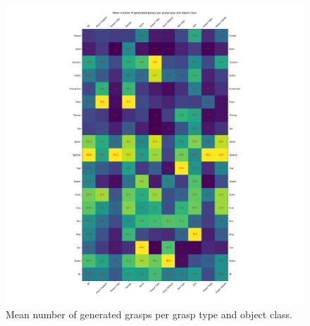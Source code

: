 \begin{figure}
\centering
\includegraphics[width=0.8\columnwidth]{images/post-analysis/[13] mean_number_of_generated_grasps_per_grasp_type_and_object_class.png}
\caption{Mean number of generated grasps per grasp type and object class.}
\label{fig:post13}
\end{figure}




